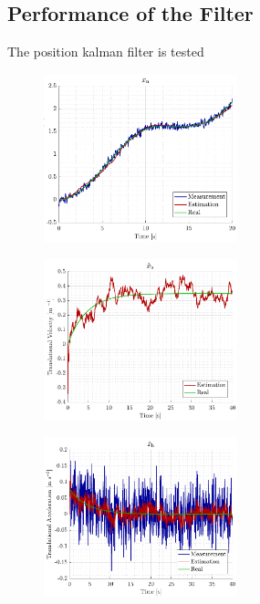 \subsection{Performance of the Filter}
The position kalman filter is tested 


\begin{figure}[H]
    \includegraphics[width=0.5\textwidth]{figures/sim_xn}
    \caption{}
    \label{fig:sim_xn}
\end{figure}



\begin{figure}[H]
    \includegraphics[width=0.5\textwidth]{figures/sim_xbdot}
    \caption{}
    \label{fig:sim_xbdot}
\end{figure}


\begin{figure}[H]
    \includegraphics[width=0.5\textwidth]{figures/sim_xbddot}
    \caption{}
    \label{fig:sim_xbddot}
\end{figure}